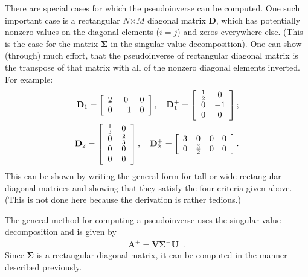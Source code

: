 There are special cases for which the pseudoinverse can be computed. One such important case is a rectangular $N$$\times$$M$ diagonal matrix $\mathbf{D}$, which has potentially nonzero values on the diagonal elements ($i = j$) and zeros everywhere else. (This is the case for the matrix $\boldsymbol\Sigma$ in the singular value decomposition). One can show (through) much effort, that the pseudoinverse of rectangular diagonal matrix is the transpose of that matrix with all of the nonzero diagonal elements inverted. For example:
\begin{align}
  \mathbf{D}_1 = \left[ \begin{array}{c c c}
  2		&  0	& 0		\\
  0		& -1	& 0		\\ \end{array} \right] , \quad 
 \mathbf{D}_1^+ = \left[ \begin{array}{c c}
  \frac{1}{2}	&  0	\\
  0				& -1	\\ 
  0				&  0	\\ \end{array} \right] ; \nonumber \\
  \mathbf{D}_2 = \left[ \begin{array}{c c}
  \frac{1}{3}	&  0			\\
  0				& \frac{2}{3}	\\ 
  0				& 0				\\
  0				& 0				\\ \end{array} \right] , \quad 
 \mathbf{D}_2^+ = \left[ \begin{array}{c c c c}
  3		&  0			&  0		&  0		\\
  0		&  \frac{3}{2}	&  0		&  0		\\ \end{array} \right] . \nonumber 
\end{align}
This can be shown by writing the general form for tall or wide rectangular diagonal matrices and showing that they satisfy the four criteria given above. (This is not done here because the derivation is rather tedious.)

The general method for computing a pseudoinverse uses the singular value decomposition and is given by
\begin{align}
  \mathbf{A}^+ = \mathbf{V} \boldsymbol\Sigma^+ \mathbf{U}^\top .
\end{align}
Since $\boldsymbol\Sigma$ is a rectangular diagonal matrix, it can be computed in the manner described previously.

